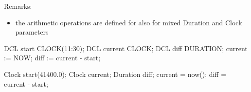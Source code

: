 Remarks:
\begin{itemize}
\item the arithmetic operations are defined for also for
   mixed Duration and Clock parameters
\end{itemize}


\begin{PEARLCode}
DCL start CLOCK(11:30);
DCL current CLOCK;
DCL diff DURATION;
current := NOW;
diff := current - start;
\end{PEARLCode}

\begin{CppCode}
Clock start(41400.0);
Clock current;
Duration diff;
current = now();
diff = current - start;
\end{CppCode}
\fi

